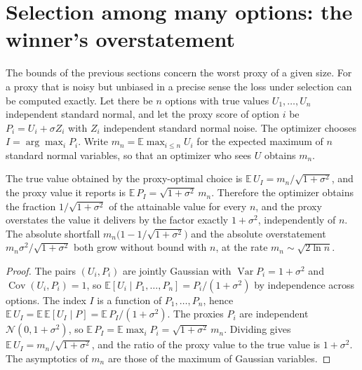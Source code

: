 \section{Selection among many options: the winner's overstatement}\label{sec:winner}

The bounds of the previous sections concern the worst proxy of a given size. For a proxy that is noisy but unbiased in a precise sense the loss under selection can be computed exactly. Let there be $n$ options with true values $U_1,\dots,U_n$ independent standard normal, and let the proxy score of option $i$ be $P_i=U_i+\sigma Z_i$ with $Z_i$ independent standard normal noise. The optimizer chooses $I=\arg\max_iP_i$. Write $m_n=\mathbb E\max_{i\le n}U_i$ for the expected maximum of $n$ standard normal variables, so that an optimizer who sees $U$ obtains $m_n$.

\begin{newresult}\label{prop:winner}
The true value obtained by the proxy-optimal choice is $\mathbb E\,U_I=m_n/\sqrt{1+\sigma^2}$, and the proxy value it reports is $\mathbb E\,P_I=\sqrt{1+\sigma^2}\,m_n$. Therefore the optimizer obtains the fraction $1/\sqrt{1+\sigma^2}$ of the attainable value for every $n$, and the proxy overstates the value it delivers by the factor exactly $1+\sigma^2$, independently of $n$. The absolute shortfall $m_n\bigl(1-1/\sqrt{1+\sigma^2}\bigr)$ and the absolute overstatement $m_n\sigma^2/\sqrt{1+\sigma^2}$ both grow without bound with $n$, at the rate $m_n\sim\sqrt{2\ln n}$.
\end{newresult}
\begin{proof}
The pairs $(U_i,P_i)$ are jointly Gaussian with $\operatorname{Var}P_i=1+\sigma^2$ and $\operatorname{Cov}(U_i,P_i)=1$, so $\mathbb E[U_i\mid P_1,\dots,P_n]=P_i/(1+\sigma^2)$ by independence across options. The index $I$ is a function of $P_1,\dots,P_n$, hence $\mathbb E\,U_I=\mathbb E\,\mathbb E[U_I\mid P]=\mathbb E\,P_I/(1+\sigma^2)$. The proxies $P_i$ are independent $\mathcal N(0,1+\sigma^2)$, so $\mathbb E\,P_I=\mathbb E\max_iP_i=\sqrt{1+\sigma^2}\,m_n$. Dividing gives $\mathbb E\,U_I=m_n/\sqrt{1+\sigma^2}$, and the ratio of the proxy value to the true value is $1+\sigma^2$. The asymptotics of $m_n$ are those of the maximum of Gaussian variables.
\end{proof}


